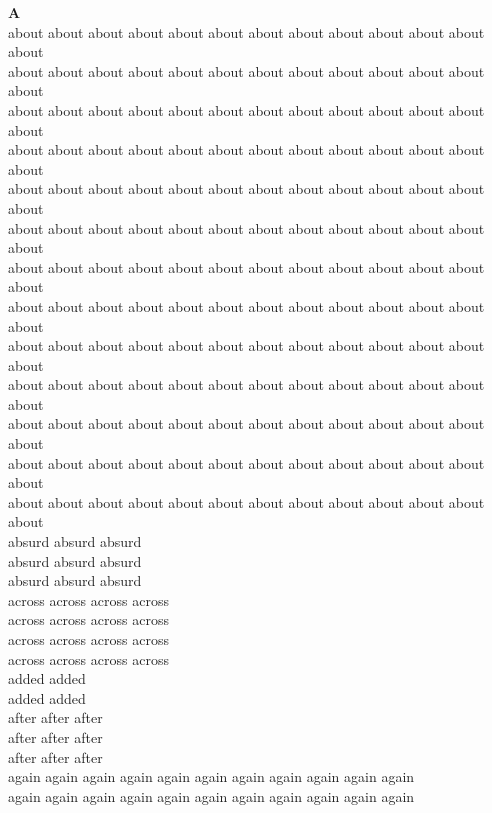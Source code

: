 
\vspace{14pt}
\noindent\textbf{\Large A}\\[+12pt]
about about about about about about about about about about about about about\\
about about about about about about about about about about about about about\\
about about about about about about about about about about about about about\\
about about about about about about about about about about about about about\\
about about about about about about about about about about about about about\\
about about about about about about about about about about about about about\\
about about about about about about about about about about about about about\\
about about about about about about about about about about about about about\\
about about about about about about about about about about about about about\\
about about about about about about about about about about about about about\\
about about about about about about about about about about about about about\\
about about about about about about about about about about about about about\\
about about about about about about about about about about about about about\\
absurd absurd absurd\\
absurd absurd absurd\\
absurd absurd absurd\\
across across across across\\
across across across across\\
across across across across\\
across across across across\\
added added\\
added added\\
after after after\\
after after after\\
after after after\\
again again again again again again again again again again again\\
again again again again again again again again again again again\\
